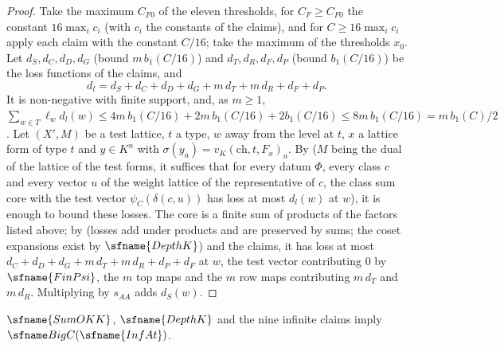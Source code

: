 \begin{proof}
Take the maximum $C_{F0}$ of the eleven thresholds, for $C_F\ge C_{F0}$ the constant $16\max_ic_i$ (with $c_i$ the constants of
the claims), and for $C\ge16\max_ic_i$ apply each claim with the constant $C/16$; take the maximum of the thresholds $x_0$.
Let $d_S,d_C,d_D,d_G$ (bound $m\,b_1(C/16)$) and $d_T,d_R,d_F,d_P$ (bound $b_1(C/16)$) be the loss functions of the claims, and
\[
d_l=d_S+d_C+d_D+d_G+m\,d_T+m\,d_R+d_F+d_P .
\]
It is non-negative with finite support, and, as $m\ge1$, $\sum_{w\in T}\ell_wd_l(w)\le4m\,b_1(C/16)+2m\,b_1(C/16)+2b_1(C/16)\le
8m\,b_1(C/16)=m\,b_1(C)/2$. Let $(X',M)$ be a test lattice, $t$ a type, $w$ away from the level at $t$, $x$ a lattice form of type
$t$ and $y\in K^n$ with $\sigma(y_a)=v_K(\mathrm{ch},t,F_x)_a$. By
 ($M$ being the
dual of the lattice of the test forms, it suffices that for every datum $\Phi$, every class $c$ and every vector $u$ of the weight
lattice of the representative of $c$, the class sum core with the test vector $\psi_C(\delta(c,u))$ has loss at most $d_l(w)$ at
$w$), it is enough to bound these losses. The core is a finite sum of products of the factors listed above; by
 (losses add under products and are preserved by
sums; the coset expansions exist by $\sfname{DepthK}$) and the claims, it has loss at most
$d_C+d_D+d_G+m\,d_T+m\,d_R+d_P+d_F$ at $w$, the test vector contributing $0$ by $\sfname{FinPsi}$, the $m$ top maps and the $m$ row
maps contributing $m\,d_T$ and $m\,d_R$. Multiplying by $s_{AA}$ adds $d_S(w)$.
\end{proof}

\begin{theorem}\label{pf:fit:infasm}
$\sfname{SumOKK}$, $\sfname{DepthK}$ and the nine infinite claims imply $\fitBigC(\sfname{InfAt})$.
\end{theorem}

